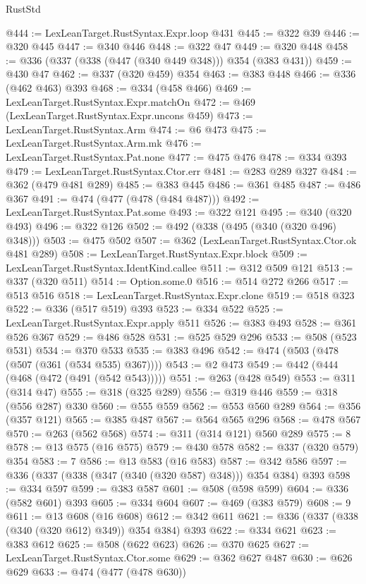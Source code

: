 \begin{lexlean}{RustStd}
\begin{coremodule}
@444 := LexLeanTarget.RustSyntax.Expr.loop @431
@445 := @322 @39
@446 := @320 @445
@447 := @340 @446
@448 := @322 @47
@449 := @320 @448
@458 := @336 (@337 (@338 (@447 (@340 @449 @348))) @354 (@383 @431))
@459 := @430 @47
@462 := @337 (@320 @459) @354
@463 := @383 @448
@466 := @336 (@462 @463) @393
@468 := @334 (@458 @466)
@469 := LexLeanTarget.RustSyntax.Expr.matchOn
@472 := @469 (LexLeanTarget.RustSyntax.Expr.uncons @459)
@473 := LexLeanTarget.RustSyntax.Arm
@474 := @6 @473
@475 := LexLeanTarget.RustSyntax.Arm.mk
@476 := LexLeanTarget.RustSyntax.Pat.none
@477 := @475 @476
@478 := @334 @393
@479 := LexLeanTarget.RustSyntax.Ctor.err
@481 := @283 @289 @327
@484 := @362 (@479 @481 @289)
@485 := @383 @445
@486 := @361 @485
@487 := @486 @367
@491 := @474 (@477 (@478 (@484 @487)))
@492 := LexLeanTarget.RustSyntax.Pat.some
@493 := @322 @121
@495 := @340 (@320 @493)
@496 := @322 @126
@502 := @492 (@338 (@495 (@340 (@320 @496) @348)))
@503 := @475 @502
@507 := @362 (LexLeanTarget.RustSyntax.Ctor.ok @481 @289)
@508 := LexLeanTarget.RustSyntax.Expr.block
@509 := LexLeanTarget.RustSyntax.IdentKind.callee
@511 := @312 @509 @121
@513 := @337 (@320 @511)
@514 := Option.some.{0}
@516 := @514 @272 @266
@517 := @513 @516
@518 := LexLeanTarget.RustSyntax.Expr.clone
@519 := @518 @323
@522 := @336 (@517 @519) @393
@523 := @334 @522
@525 := LexLeanTarget.RustSyntax.Expr.apply @511
@526 := @383 @493
@528 := @361 @526 @367
@529 := @486 @528
@531 := @525 @529 @296
@533 := @508 (@523 @531)
@534 := @370 @533
@535 := @383 @496
@542 := @474 (@503 (@478 (@507 (@361 (@534 @535) @367))))
@543 := @2 @473
@549 := @442 (@444 (@468 (@472 (@491 (@542 @543)))))
@551 := @263 (@428 @549)
@553 := @311 (@314 @47)
@555 := @318 (@325 @289)
@556 := @319 @446
@559 := @318 (@556 @287) @330
@560 := @555 @559
@562 := @553 @560 @289
@564 := @356 (@357 @121)
@565 := @385 @487
@567 := @564 @565 @296
@568 := @478 @567
@570 := @263 (@562 @568)
@574 := @311 (@314 @121) @560 @289
@575 := 8
@578 := @13 @575 (@16 @575)
@579 := @430 @578
@582 := @337 (@320 @579) @354
@583 := 7
@586 := @13 @583 (@16 @583)
@587 := @342 @586
@597 := @336 (@337 (@338 (@347 (@340 (@320 @587) @348))) @354 @384) @393
@598 := @334 @597
@599 := @383 @587
@601 := @508 (@598 @599)
@604 := @336 (@582 @601) @393
@605 := @334 @604
@607 := @469 (@383 @579)
@608 := 9
@611 := @13 @608 (@16 @608)
@612 := @342 @611
@621 := @336 (@337 (@338 (@340 (@320 @612) @349)) @354 @384) @393
@622 := @334 @621
@623 := @383 @612
@625 := @508 (@622 @623)
@626 := @370 @625
@627 := LexLeanTarget.RustSyntax.Ctor.some
@629 := @362 @627 @487
@630 := @626 @629
@633 := @474 (@477 (@478 @630))

\end{coremodule}
\end{lexlean}
